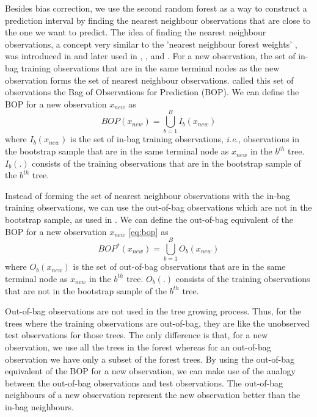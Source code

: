 Besides bias correction, we use the second random forest as a way to construct a prediction interval by finding the nearest neighbour observations that are close to the one we want to predict. The idea of finding the nearest neighbour observations, a concept very similar to the 'nearest neighbour forest weights' \citep{hothorn_bagging_2004, lin_random_2006}, was introduced in \cite{moradian_l1_2017} and later used in \cite{moradian_survival_2019}, \cite{roy_prediction_2020}, \cite{tabib_non-parametric_2020} and \cite{alakus_conditional_2021}. For a new observation, the set of in-bag training observations that are in the same terminal nodes as the new observation forms the set of nearest neighbour observations. \cite{roy_prediction_2020} called this set of observations the Bag of Observations for Prediction (BOP). We can define the BOP for a new observation $x_{new}$ as
\begin{equation} \label{eq:bop}
    BOP\left(x_{new}\right) = \bigcup\limits_{b=1}^{B} I_b\left(x_{new}\right)
\end{equation}
where $I_b\left(x_{new}\right)$ is the set of in-bag training observations, \emph{i.e.}, observations in the bootstrap sample that are in the same terminal node as $x_{new}$ in the $b^{th}$ tree. $I_b\left(.\right)$ consists of the training observations that are in the bootstrap sample of the $b^{th}$ tree.

Instead of forming the set of nearest neighbour observations with the in-bag training observations, we can use the out-of-bag observations which are not in the bootstrap sample, as used in \citet{lu_unified_2021}. We can define the out-of-bag equivalent of the BOP for a new observation $x_{new}$ \eqref{eq:bop} as 
\begin{equation} \label{eq:bop2}
    BOP^{*}\left(x_{new}\right) = \bigcup\limits_{b=1}^{B} O_b\left(x_{new}\right)
\end{equation}
where $O_b\left(x_{new}\right)$ is the set of out-of-bag observations that are in the same terminal node as $x_{new}$ in the $b^{th}$ tree. $O_b\left(.\right)$ consists of the training observations that are not in the bootstrap sample of the $b^{th}$ tree. 

Out-of-bag observations are not used in the tree growing process. Thus, for the trees where the training observations are out-of-bag, they are like the unobserved test observations for those trees. The only difference is that, for a new observation, we use all the trees in the forest whereas for an out-of-bag observation we have only a subset of the forest trees. By using the out-of-bag equivalent of the BOP for a new observation, we can make use of the analogy between the out-of-bag observations and test observations. The out-of-bag neighbours of a new observation represent the new observation better than the in-bag neighbours.


